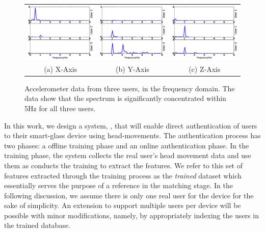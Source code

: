 \begin{figure}[t]
\begin{center}
\begin{tabular}{ccc}
\includegraphics [width=.33\linewidth]{figure/freq_x.eps}&
\includegraphics [width=.33\linewidth]{figure/freq_y.eps}&
\includegraphics [width=.33\linewidth]{figure/freq_z.eps}\\
(a) X-Axis & (b) Y-Axis & (c) Z-Axis \\
\end{tabular}
\end{center}
\caption{\label{fig:raw_freq} Accelerometer data from three users, in the frequency
domain. The data show that the spectrum is significantly
concentrated within 5Hz for all three users.}
\end{figure}

In this work, we design a system, \systemname, that will enable direct authentication of users to their smart-glass device using
head-movements.  %
The authentication process has two phases: a offline training phase and an 
online authentication phase. In the training phase, the system 
collects the real user's head movement data and use them as 
conducts the training to extract the features. We refer to this set of 
features extracted through the training process as the {\em trained} dataset 
which essentially serves the purpose of a reference in the matching stage. 
In the following discussion, we assume there is only 
one real user for the device for the sake of simplicity. An extension to 
support multiple users per device will be possible with minor modifications, 
namely, by appropriately indexing the users in the trained database.

